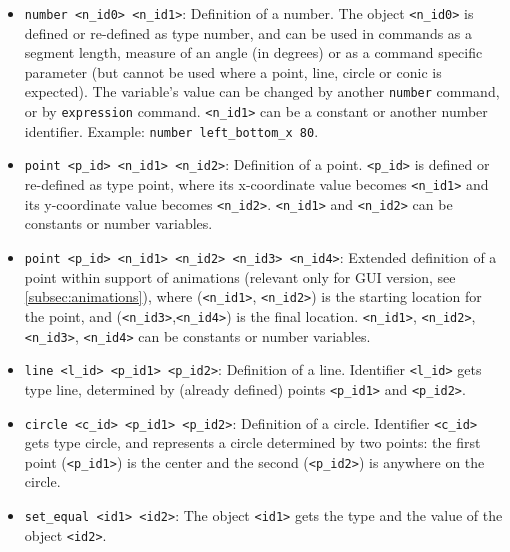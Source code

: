 \documentclass[a4paper]{book}
\begin{document}
\begin{itemize}
\item \verb|number <n_id0> <n_id1>|:
    Definition of a number. The object \verb|<n_id0>| is defined or re-defined
    as type {\sc number}, and can be used in commands as a segment length,
    measure of an angle (in degrees) or as a command specific parameter
    (but cannot be used where a {\sc point}, {\sc line}, {\sc circle} or
    {\sc conic} is expected). The variable's value can be changed by
    another \verb|number| command, or by \verb|expression| command.
    \verb|<n_id1>| can be a constant or another number identifier. Example:
    \verb|number left_bottom_x 80|.

\item \verb|point <p_id> <n_id1> <n_id2>|:
    Definition of a point. \verb|<p_id>| is defined or re-defined as type
    {\sc point}, where its x-coordinate value becomes \verb|<n_id1>| and its
    y-coordinate value becomes \verb|<n_id2>|. \verb|<n_id1>| and \verb|<n_id2>|
    can be constants or number variables.

\item \verb|point <p_id> <n_id1> <n_id2> <n_id3> <n_id4>|:
    Extended definition of a point within support of animations (relevant 
    only for GUI version, see \ref{subsec:animations}), where (\verb|<n_id1>|,
    \verb|<n_id2>|) is the starting location for the point, and
    (\verb|<n_id3>|,\verb|<n_id4>|) is the final location.
    \verb|<n_id1>|, \verb|<n_id2>|, \verb|<n_id3>|, \verb|<n_id4>|
    can be constants or number variables.

\item \verb|line <l_id> <p_id1> <p_id2>|:
    Definition of a line. Identifier \verb|<l_id>| gets type {\sc line},
    determined by (already defined) points \verb|<p_id1>| and \verb|<p_id2>|.

\item \verb|circle <c_id> <p_id1> <p_id2>|:
    Definition of a circle. Identifier \verb|<c_id>| gets type {\sc circle}, and 
    represents a circle determined by two points: the first point (\verb|<p_id1>|)
    is the center and the second (\verb|<p_id2>|) is anywhere on the circle.

\item \verb|set_equal <id1> <id2>|:
    The object \verb|<id1>| gets the type and the value of the object \verb|<id2>|.
\end{itemize}
\end{document}
